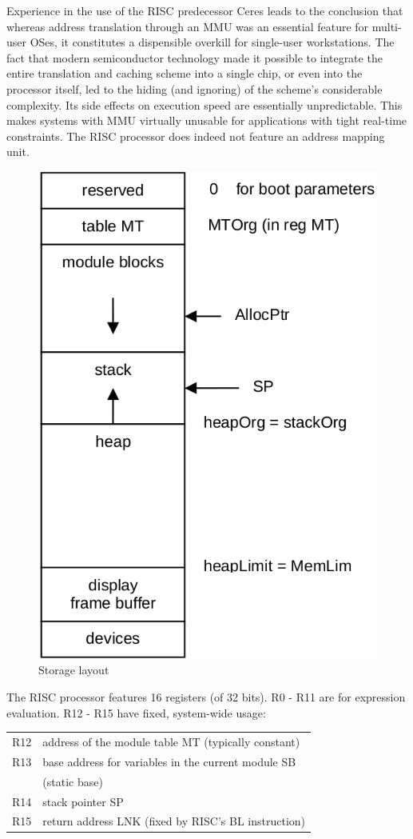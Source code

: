 Experience in the use of the RISC predecessor Ceres leads to the conclusion that whereas
address translation through an MMU was an essential feature for multi-user OSes, it constitutes
a dispensible overkill for single-user workstations. The fact that modern semiconductor technology
made it possible to integrate the entire translation and caching scheme into a single chip,
or even into the processor itself, led to the hiding (and ignoring) of the scheme's considerable
complexity. Its side effects on execution speed are essentially unpredictable. This makes systems
with MMU virtually unusable for applications with tight real-time constraints. The RISC processor
does indeed not feature an address mapping unit.
\begin{figure}[h!]
  \centering
  \includegraphics[width=.6\textwidth]{i/q}
  \caption{Storage layout}
  \label{fig:storage-layout}
\end{figure}

The RISC processor features 16 registers (of 32 bits). R0 - R11 are for expression evaluation.
R12 - R15 have fixed, system-wide usage:
\begin{table}[h!]
  \centering
  \begin{tabular}{l l}
    R12 & address of the module table MT (typically constant) \\
    R13 & base address for variables in the current module SB \\
        & (static base) \\
    R14 & stack pointer SP \\
    R15 & return address LNK (fixed by RISC's BL instruction)
  \end{tabular}
\end{table}

